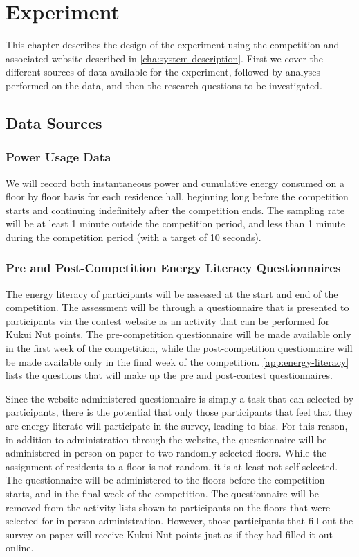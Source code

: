 \chapter{Experiment}

This chapter describes the design of the experiment using the competition and associated website described in \autoref{cha:system-description}. First we cover the different sources of data available for the experiment, followed by analyses performed on the data, and then the research questions to be investigated.

\section{Data Sources}

\subsection{Power Usage Data}
\label{sec:power-usage-data}

We will record both instantaneous power and cumulative energy consumed on a floor by floor basis for each residence hall, beginning long before the competition starts and continuing indefinitely after the competition ends. The sampling rate will be at least 1 minute outside the competition period, and less than 1 minute during the competition period (with a target of 10 seconds).

\subsection{Pre and Post-Competition Energy Literacy Questionnaires}
\label{sec:exp-literacy-questionnaire}

The energy literacy of participants will be assessed at the start and end of the competition. The assessment will be through a questionnaire that is presented to participants via the contest website as an activity that can be performed for Kukui Nut points. The pre-competition questionnaire will be made available only in the first week of the competition, while the post-competition questionnaire will be made available only in the final week of the competition. \autoref{app:energy-literacy} lists the questions that will make up the pre and post-contest questionnaires.

Since the website-administered questionnaire is simply a task that can selected by participants, there is the potential that only those participants that feel that they are energy literate will participate in the survey, leading to bias. For this reason, in addition to administration through the website, the questionnaire will be administered in person on paper to two randomly-selected floors. While the assignment of residents to a floor is not random, it is at least not self-selected. The questionnaire will be administered to the floors before the competition starts, and in the final week of the competition. The questionnaire will be removed from the activity lists shown to participants on the floors that were selected for in-person administration. However, those participants that fill out the survey on paper will receive Kukui Nut points just as if they had filled it out online.

